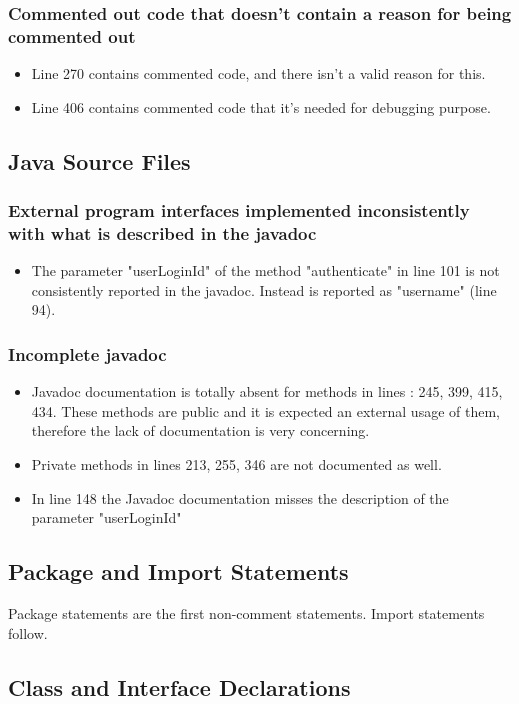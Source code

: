 \subsubsection{Commented out code that doesn't contain a reason for being commented out}
\begin{itemize}
\item Line 270 contains commented code, and there isn't a valid reason for this.
\item Line 406 contains commented code that it's needed for debugging purpose.
\end{itemize}

\subsection{Java Source Files}
\subsubsection{External program interfaces implemented inconsistently with what is described in the javadoc}
\begin{itemize}
\item The parameter "userLoginId" of the method "authenticate" in line 101 is not consistently reported in the javadoc. Instead is reported as "username" (line 94). 
\end{itemize}
\subsubsection{Incomplete javadoc}
\begin{itemize}
\item Javadoc documentation is totally absent for methods in lines : 245, 399, 415, 434.  These methods are public and it is expected an external usage of them, therefore the lack of documentation is very concerning.
\item Private methods in lines 213, 255, 346 are not documented as well. 
\item In line 148 the Javadoc documentation misses the description of the parameter "userLoginId"
\end{itemize}



\subsection{Package and Import Statements}
Package statements are the first non-comment statements. Import statements follow.
\subsection{Class and Interface Declarations}

